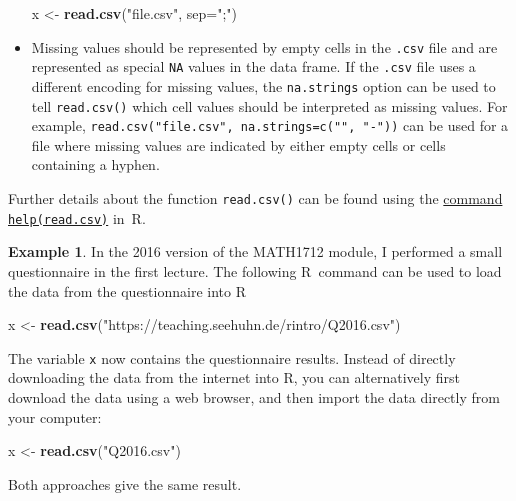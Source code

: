 \documentclass[
  a4paper,
]{article}
\newenvironment{Shaded}{\begin{snugshade}}{\end{snugshade}}
\newcommand{\AttributeTok}[1]{\textcolor[rgb]{0.13,0.29,0.53}{#1}}
\newcommand{\FunctionTok}[1]{\textcolor[rgb]{0.13,0.29,0.53}{\textbf{#1}}}
\newcommand{\NormalTok}[1]{#1}
\newcommand{\OtherTok}[1]{\textcolor[rgb]{0.56,0.35,0.01}{#1}}
\newcommand{\StringTok}[1]{\textcolor[rgb]{0.31,0.60,0.02}{#1}}
\theoremstyle{definition}
\theoremstyle{definition}
\newtheorem{example}{Example}[section]
\theoremstyle{definition}
\theoremstyle{definition}
\theoremstyle{remark}
\begin{document}
\begin{itemize}
\begin{Shaded}
\begin{Highlighting}[]
\NormalTok{  x }\OtherTok{\textless{}{-}} \FunctionTok{read.csv}\NormalTok{(}\StringTok{"file.csv"}\NormalTok{, }\AttributeTok{sep=}\StringTok{";"}\NormalTok{)}
\end{Highlighting}
\end{Shaded}
\item
  Missing values should be represented by empty cells in the \texttt{.csv}
  file and are represented as special \texttt{NA} values in the data frame.
  If the \texttt{.csv} file uses a different encoding for missing values,
  the \texttt{na.strings} option can be used to tell \texttt{read.csv()}
  which cell values should be interpreted as missing values. For example,
  \texttt{read.csv("file.csv",\ na.strings=c("",\ "-"))} can be used for a file
  where missing values are indicated by either empty cells or cells
  containing a hyphen.
\end{itemize}

Further details about the function \texttt{read.csv()} can be found using the
\href{https://rdrr.io/r/utils/read.table.html}{command \texttt{help(read.csv)}} in~R.

\begin{example}
\protect\hypertarget{exm:l1-poll-import}{}\label{exm:l1-poll-import}In the 2016 version of the MATH1712 module, I performed a small questionnaire
in the first lecture. The following R~command can be used to load the data
from the questionnaire into R

\begin{Shaded}
\begin{Highlighting}[]
\NormalTok{  x }\OtherTok{\textless{}{-}} \FunctionTok{read.csv}\NormalTok{(}\StringTok{"https://teaching.seehuhn.de/rintro/Q2016.csv"}\NormalTok{)}
\end{Highlighting}
\end{Shaded}

The variable \texttt{x} now contains the questionnaire results.
Instead of
directly downloading the data from the internet into R, you can
alternatively first download the data using a web browser, and then
import the data directly from your computer:

\begin{Shaded}
\begin{Highlighting}[]
\NormalTok{  x }\OtherTok{\textless{}{-}} \FunctionTok{read.csv}\NormalTok{(}\StringTok{"Q2016.csv"}\NormalTok{)}
\end{Highlighting}
\end{Shaded}

Both approaches give the same result.
\end{example}
\end{document}
